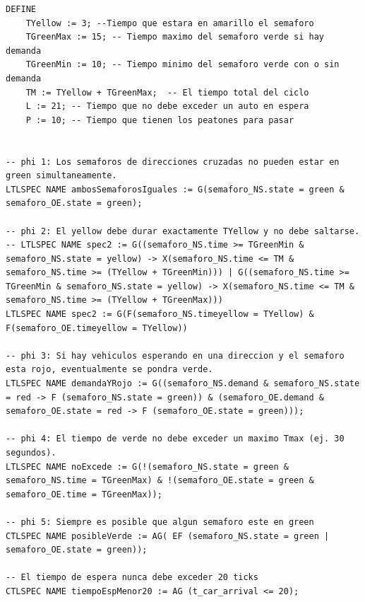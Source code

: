 \begin{lstlisting}[language=NuSMV, caption={Modelo con errores introducidos para violar specs 4 y 5}]
DEFINE
    TYellow := 3; --Tiempo que estara en amarillo el semaforo
    TGreenMax := 15; -- Tiempo maximo del semaforo verde si hay demanda
    TGreenMin := 10; -- Tiempo minimo del semaforo verde con o sin demanda
    TM := TYellow + TGreenMax;  -- El tiempo total del ciclo
    L := 21; -- Tiempo que no debe exceder un auto en espera
    P := 10; -- Tiempo que tienen los peatones para pasar


-- phi 1: Los semaforos de direcciones cruzadas no pueden estar en green simultaneamente.
LTLSPEC NAME ambosSemaforosIguales := G(semaforo_NS.state = green & semaforo_OE.state = green);

-- phi 2: El yellow debe durar exactamente TYellow y no debe saltarse.
-- LTLSPEC NAME spec2 := G((semaforo_NS.time >= TGreenMin & semaforo_NS.state = yellow) -> X(semaforo_NS.time <= TM & semaforo_NS.time >= (TYellow + TGreenMin))) | G((semaforo_NS.time >= TGreenMin & semaforo_NS.state = yellow) -> X(semaforo_NS.time <= TM & semaforo_NS.time >= (TYellow + TGreenMax)))
LTLSPEC NAME spec2 := G(F(semaforo_NS.timeyellow = TYellow) & F(semaforo_OE.timeyellow = TYellow))

-- phi 3: Si hay vehiculos esperando en una direccion y el semaforo esta rojo, eventualmente se pondra verde.
LTLSPEC NAME demandaYRojo := G((semaforo_NS.demand & semaforo_NS.state = red -> F (semaforo_NS.state = green)) & (semaforo_OE.demand & semaforo_OE.state = red -> F (semaforo_OE.state = green)));

-- phi 4: El tiempo de verde no debe exceder un maximo Tmax (ej. 30 segundos).
LTLSPEC NAME noExcede := G(!(semaforo_NS.state = green &  semaforo_NS.time = TGreenMax) & !(semaforo_OE.state = green &  semaforo_OE.time = TGreenMax)); 

-- phi 5: Siempre es posible que algun semaforo este en green
CTLSPEC NAME posibleVerde := AG( EF (semaforo_NS.state = green | semaforo_OE.state = green));

-- El tiempo de espera nunca debe exceder 20 ticks
CTLSPEC NAME tiempoEspMenor20 := AG (t_car_arrival <= 20);
\end{lstlisting}



